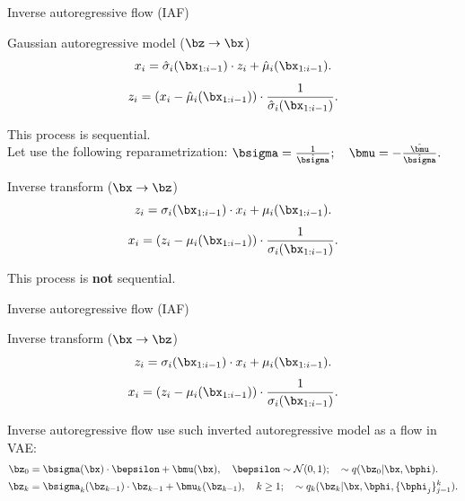 \begin{frame}{Inverse autoregressive flow (IAF)}
	
	\begin{block}{Gaussian autoregressive model ($\bz \rightarrow \bx$)}
		\vspace{-0.2cm}
		\[
			x_i = \hat{\sigma}_i (\bx_{1:i-1}) \cdot z_i + \hat{\mu}_i(\bx_{1:i-1}).
		\]
		\[
			z_i = \left(x_i - \hat{\mu}_i(\bx_{1:i-1}) \right) \cdot \frac{1}{ \hat{\sigma}_i (\bx_{1:i-1})}.
		\]
		\vspace{-0.3cm}
	\end{block}
	This process is sequential. \\
	Let use the following reparametrization:
	$\bsigma = \frac{1}{\hat{\bsigma}}; \quad \bmu = - \frac{\hat{\bmu}}{\hat{\bsigma}}.$
	
	\begin{block}{Inverse transform ($\bx \rightarrow \bz$)}
		\vspace{-0.2cm}
		\[
			z_i = \sigma_i (\bx_{1:i-1}) \cdot x_i + \mu_i(\bx_{1:i-1}).
		\]
		\[
			x_i = \left( z_i - \mu_i(\bx_{1:i-1})\right) \cdot \frac{1}{\sigma_i (\bx_{1:i-1}) }.
		\]
		\vspace{-0.3cm}
	\end{block}
	This process is \textbf{not} sequential.
\end{frame}
\begin{frame}{Inverse autoregressive flow (IAF)}
	
	\begin{block}{Inverse transform ($\bx \rightarrow \bz$)}
		\vspace{-0.2cm}
		\[
			z_i = \sigma_i (\bx_{1:i-1}) \cdot x_i + \mu_i(\bx_{1:i-1}).
		\]
		\[
			x_i = \left( z_i - \mu_i(\bx_{1:i-1})\right) \cdot \frac{1}{\sigma_i (\bx_{1:i-1})}.
		\]
		\vspace{-0.3cm}
	\end{block}
	Inverse autoregressive flow use such inverted autoregressive model as a flow in VAE:
	\begin{align*}
		\bz_0 &= \bsigma(\bx) \cdot \bepsilon + \bmu(\bx), \quad \bepsilon \sim \mathcal{N}(0, 1); \quad  \sim q(\bz_0 | \bx, \bphi). \\
		\bz_k &= \bsigma_k(\bz_{k - 1}) \cdot \bz_{k-1} + \bmu_k(\bz_{k - 1}), \quad k \geq 1; \quad  \sim q_k(\bz_k | \bx, \bphi, \{\bphi_j\}_{j=1}^k).
	\end{align*}
\end{frame}
